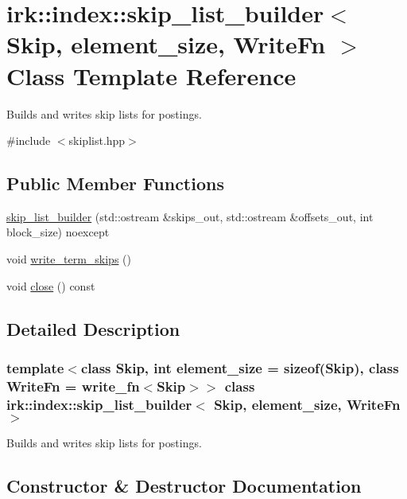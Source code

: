\hypertarget{classirk_1_1index_1_1skip__list__builder}{}\section{irk\+:\+:index\+:\+:skip\+\_\+list\+\_\+builder$<$ Skip, element\+\_\+size, Write\+Fn $>$ Class Template Reference}
\label{classirk_1_1index_1_1skip__list__builder}


Builds and writes skip lists for postings.  




{\ttfamily \#include $<$skiplist.\+hpp$>$}

\subsection*{Public Member Functions}
\begin{DoxyCompactItemize}
\item 
\mbox{\hyperlink{classirk_1_1index_1_1skip__list__builder_a55f45083c19eb7e4a03aeda3e5e1c501}{skip\+\_\+list\+\_\+builder}} (std\+::ostream \&skips\+\_\+out, std\+::ostream \&offsets\+\_\+out, int block\+\_\+size) noexcept
\item 
void \mbox{\hyperlink{classirk_1_1index_1_1skip__list__builder_ae3526c260650dda4bd771087927fe871}{write\+\_\+term\+\_\+skips}} ()
\item 
void \mbox{\hyperlink{classirk_1_1index_1_1skip__list__builder_afddff8af3fc2fdd09950ae6036b2bc0c}{close}} () const
\end{DoxyCompactItemize}


\subsection{Detailed Description}
\subsubsection*{template$<$class Skip, int element\+\_\+size = sizeof(\+Skip), class Write\+Fn = write\+\_\+fn$<$\+Skip$>$$>$\newline
class irk\+::index\+::skip\+\_\+list\+\_\+builder$<$ Skip, element\+\_\+size, Write\+Fn $>$}

Builds and writes skip lists for postings. 

\subsection{Constructor \& Destructor Documentation}
\mbox{\label{classirk_1_1index_1_1skip__list__builder_a55f45083c19eb7e4a03aeda3e5e1c501}} 
